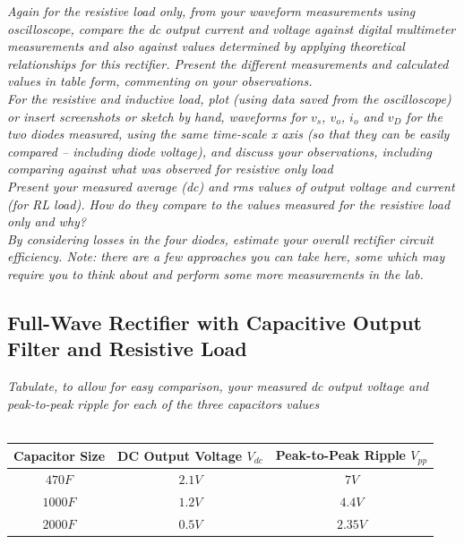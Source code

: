 \documentclass[12pt,a4paper]{article}
\begin{document}
\textit{Again for the resistive load only, from your waveform measurements using oscilloscope, compare
the dc output current and voltage against digital multimeter measurements and also against values
determined by applying theoretical relationships for this rectifier. Present the different measurements
and calculated values in table form, commenting on your observations.}\\

\textit{For the resistive and inductive load, plot (using data saved from the oscilloscope) or insert
screenshots or sketch by hand, waveforms for $v_s$, $v_o$, $i_o$ and $v_D$ for the two diodes measured, using
the same time-scale x axis (so that they can be easily compared – including diode voltage), and
discuss your observations, including comparing against what was observed for resistive only load}\\

\textit{Present your measured average (dc) and rms values of output voltage and current (for RL load).
How do they compare to the values measured for the resistive load only and why?}\\

\textit{By considering losses in the four diodes, estimate your overall rectifier circuit efficiency. Note: there
are a few approaches you can take here, some which may require you to think about and perform
some more measurements in the lab.}\\
\subsection{Full-Wave Rectifier with Capacitive Output Filter and Resistive Load}
\textit{Tabulate, to allow for easy comparison, your measured dc output voltage and peak-to-peak ripple for each of the three capacitors values}\\\\

\begin{center}
	\begin{tabular}{|c|c|c|}
		\hline
		\centering\textbf{Capacitor Size} & \centering\textbf{DC Output Voltage $V_{dc}$} &\centering\textbf{Peak-to-Peak Ripple $V_{pp}$}\tabularnewline 
		\hline
		$470 F$ & $2.1V$ & $7V$ \\
		\hline
		$1000 F$ & $1.2V$ & $4.4V$\\
		\hline
		$2000 F$ & $0.5V$ & $2.35V$\\
		\hline
	\end{tabular}
\end{center}
\end{document}
